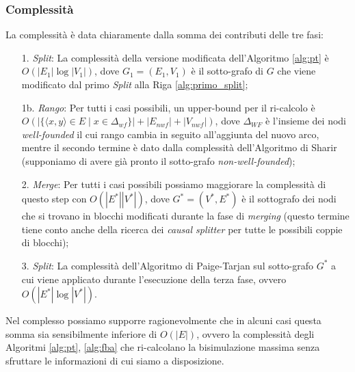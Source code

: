 \subsubsection{Complessità}
La complessità è data chiaramente dalla somma dei contributi delle tre fasi:
\begin{enumerate}
    \item[1.] \emph{Split}: La complessità della versione modificata dell'Algoritmo \ref{alg:pt} è $O(|E_1|\log |V_1|)$, dove $G_1=(E_1, V_1)$ è il sotto-grafo di $G$ che viene modificato dal primo \emph{Split} alla Riga \ref{alg:primo_split};
    \item[1b.] \emph{Rango}: Per tutti i casi possibili, un upper-bound per il ri-calcolo è $O(|\{\langle x,y\rangle \in E \mid x \in \Delta_{wf}\}| + |E_{nwf}| + |V_{nwf}|)$, dove $\Delta_{WF}$ è l'insieme dei nodi \emph{well-founded} il cui rango cambia in seguito all'aggiunta del nuovo arco, mentre il secondo termine è dato dalla complessità dell'Algoritmo di Sharir \cite{sharir} (supponiamo di avere già pronto il sotto-grafo \emph{non-well-founded});
    \item[2.] \emph{Merge}: Per tutti i casi possibili possiamo maggiorare la complessità di questo step con $O(|E^*||V^*|)$, dove $G^*=(V^*,E^*)$ è il sottografo dei nodi che si trovano in blocchi modificati durante la fase di \emph{merging} (questo termine tiene conto anche della ricerca dei \emph{causal splitter} per tutte le possibili coppie di blocchi);
    \item[3.] \emph{Split}: La complessità dell'Algoritmo di Paige-Tarjan sul sotto-grafo $G^*$ a cui viene applicato durante l'esecuzione della terza fase, ovvero $O(|E^*| \log |V^*|)$.
\end{enumerate}
Nel complesso possiamo supporre ragionevolmente che in alcuni casi questa somma sia sensibilmente inferiore di $O(|E|)$, ovvero la complessità degli Algoritmi \ref{alg:pt}, \ref{alg:fba} che ri-calcolano la bisimulazione massima senza sfruttare le informazioni di cui siamo a disposizione.
